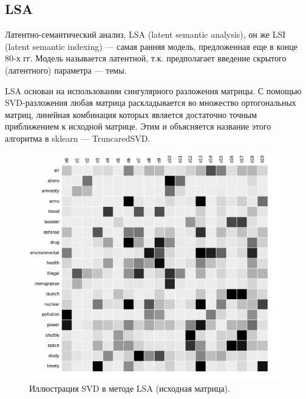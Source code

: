 \documentclass[10pt]{article}
\begin{document}
\subsection{LSA}

Латентно-семантический анализ, LSA (latent semantic analysis), он же LSI (latent semantic indexing) --- самая ранняя модель, предложенная еще в конце 80-х гг. Модель называется латентной, т.к. предполагает введение скрытого (латентного) параметра — темы.

LSA основан на использовании сингулярного разложения матрицы. С помощью SVD-разложения любая матрица раскладывается во множество ортогональных матриц, линейная комбинация которых является достаточно точным приближением к исходной матрице. Этим и объясняется название этого алгоритма в sklearn — TruncaredSVD.

\begin{figure}[H]
	\begin{center}
		\includegraphics[scale = 0.5]{LSA1.png}
		\caption{Иллюстрация SVD в методе LSA (исходная матрица).}
	\end{center}
\end{figure}
\end{document}
